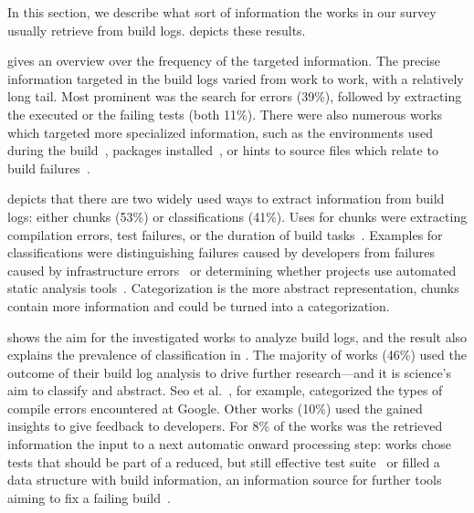 In this section, we describe what sort of information the works in
our survey usually retrieve from build logs.
 depicts these results.

 gives an overview over the frequency of
the targeted information.
The precise information targeted in the build logs varied from work
to work, with a relatively long tail.
Most prominent was the search for errors (39\%), followed by extracting
the executed or the failing
tests (both 11\%).
There were also numerous works which targeted more specialized
information, such as the environments used during the
build~\cite{zolfagharinia2017not}, packages
installed~\cite{selberg2012use}, or hints to source files which
relate to build failures~\cite{ren2018automated}.

 depicts that there are two widely used ways to
extract information from build logs: either chunks (53\%) or
classifications (41\%).
Uses for chunks were extracting compilation errors,
test failures, or the duration of build
tasks~\cite{clemencic2014new,zhang2016android}.
Examples for
classifications were distinguishing failures caused by developers from
failures caused by infrastructure errors~\cite{lindqvist2019detection}
or determining whether projects use automated static analysis
tools~\cite{kavaler2019tool}.
Categorization is the more abstract representation, chunks
contain more information and could be turned into a categorization.

 shows the aim for the
investigated works to analyze build logs, and the result also explains
the prevalence of classification in .
The majority of works (46\%) used the outcome of their build log
analysis to drive further research---and it is science's aim to
classify and abstract.
Seo et al.~\cite{seo2014programmers}, for example,
categorized the types of compile errors encountered at
Google.
Other works (10\%) used the gained insights to give feedback to
developers.
For 8\% of the works was the retrieved information the input
to a next automatic onward processing step:
works chose
tests that should be part of a reduced, but still effective test
suite~\cite{shi2018evaluating} or filled     a data structure with
build information, an information source for further tools aiming
to fix a failing build~\cite{vassallo2018un-break}.

